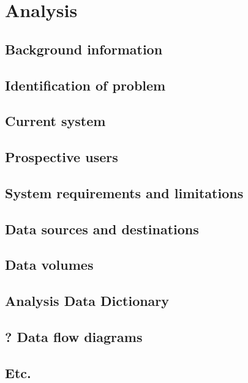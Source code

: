 \section{Analysis}

\subsection{Background information}
\lipsum
\subsection{Identification of problem}
\lipsum
\subsection{Current system}
\lipsum
\subsection{Prospective users}
\lipsum
\subsection{System requirements and limitations}
\lipsum
\subsection{Data sources and destinations}
\lipsum
\subsection{Data volumes}
\lipsum
\subsection{Analysis Data Dictionary}
\lipsum
\subsection{? Data flow diagrams}
\lipsum
\subsection{Etc.}
\lipsum

